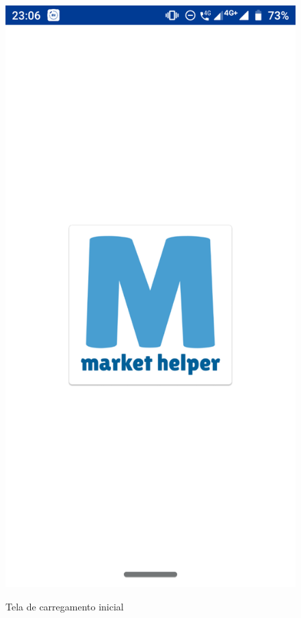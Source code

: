 \begin{figure}[h]
    \centering
    \caption{Tela de carregamento inicial}
    \includegraphics[scale=0.15]{tcc/figures/app/app_loading.png}
    \label{appLoadingFig}
\end{figure}


